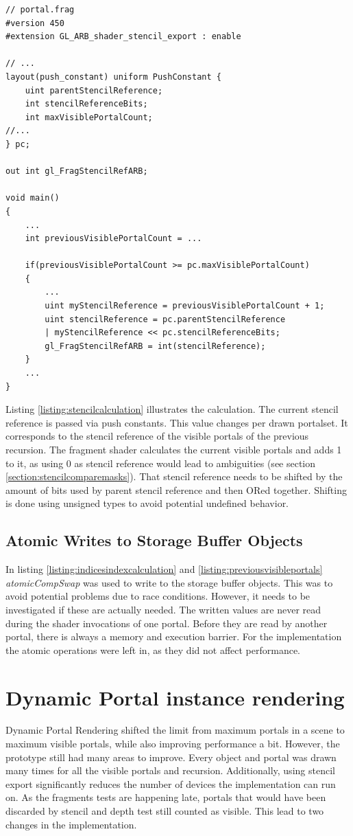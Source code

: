 \begin{lstlisting}[caption={Calculate Stencil Reference in Shader}, label=listing:stencilcalculation]
// portal.frag
#version 450
#extension GL_ARB_shader_stencil_export : enable

// ...
layout(push_constant) uniform PushConstant {	
	uint parentStencilReference;
	int stencilReferenceBits;
	int maxVisiblePortalCount;
//...
} pc;

out int gl_FragStencilRefARB;

void main()
{
	...
	int previousVisiblePortalCount = ...
	
	if(previousVisiblePortalCount >= pc.maxVisiblePortalCount)
	{
		...
		uint myStencilReference = previousVisiblePortalCount + 1;
		uint stencilReference = pc.parentStencilReference 
		| myStencilReference << pc.stencilReferenceBits;
		gl_FragStencilRefARB = int(stencilReference);
	}	
	...
}
\end{lstlisting}

Listing \ref{listing:stencilcalculation} illustrates the calculation. The current stencil reference is passed via push constants. This value changes per drawn \gls{portalset}. It corresponds to the stencil reference of the visible portals of the previous recursion. The fragment shader calculates the current visible portals and adds 1 to it, as using 0 as stencil reference would lead to ambiguities (see section \ref{section:stencilcomparemasks}). That stencil reference needs to be shifted by the amount of bits used by parent stencil reference and then ORed together. Shifting is done using unsigned types to avoid potential undefined behavior.

\subsection{Atomic Writes to Storage Buffer Objects}
In listing  \ref{listing:indicesindexcalculation} and \ref{listing:previousvisibleportals} \textit{atomicCompSwap} was used to write to the storage buffer objects. This was to avoid potential problems due to race conditions. However, it needs to be investigated if these are actually needed. The written values are never read during the shader invocations of one portal. Before they are read by another portal, there is always a memory and execution barrier. For the implementation the atomic operations were left in, as they did not affect performance.

\section{Dynamic Portal instance rendering}
\label{section:dynamicportalinstancerendering}
Dynamic Portal Rendering shifted the limit from maximum portals in a scene to maximum visible portals, while also improving performance a bit. However, the prototype still had many areas to improve. Every object and portal was drawn many times for all the visible portals and recursion. Additionally, using stencil export significantly reduces the number of devices the implementation can run on. As the fragments tests are happening late, portals that would have been discarded by stencil and depth test still counted as visible. This lead to two changes in the implementation.

